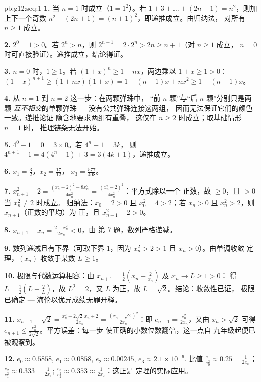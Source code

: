 \begin{solution}{pb:g12:seq:1}
\textbf{1.} 当 $n = 1$ 时成立（$1 = 1^2$）。若
$1 + 3 + \dots + (2n - 1) = n^2$，则加上下一个奇数
$n^2 + (2n + 1) = (n + 1)^2$，即递推成立。由归纳法，
对所有 $n \geq 1$ 成立。

\textbf{2.} $2^0 = 1 > 0$。若 $2^n > n$，则
$2^{n+1} = 2 \cdot 2^n > 2n \geq n + 1$（对 $n \geq 1$ 成立，
$n = 0$ 时可直接验证）。递推成立，结论得证。

\textbf{3.} $n = 0$ 时，$1 \geq 1$。若
$(1 + x)^n \geq 1 + nx$，两边乘以 $1 + x \geq 1 > 0$：
$(1 + x)^{n+1} \geq (1 + nx)(1 + x) = 1 + (n + 1)x + nx^2
\geq 1 + (n + 1)x$。

\textbf{4.} 从 $n = 1$ 到 $n = 2$ 这一步：在两颗弹珠中，
“前 $n$ 颗”与“后 $n$ 颗”分别只是两颗
\emph{互不相交}的单颗弹珠 --- 没有公共弹珠连接这两组，
因而无法保证它们的颜色一致。递推论证
隐含地要求两组有重叠，
这仅在 $n \geq 2$ 时成立；取基础情形 $n = 1$ 时，
推理链条无法开始。

\textbf{5.} $4^0 - 1 = 0 = 3 \times 0$。若 $4^n - 1 = 3k$，
则 $4^{n+1} - 1 = 4(4^n - 1) + 3 = 3(4k + 1)$，递推成立。

\textbf{6.} $x_1 = \frac32$，$x_2 = \frac{17}{12}$，
$x_3 = \frac{577}{408}$。

\textbf{7.} $x_{n+1}^2 - 2 = \frac{(x_n^2 + 2)^2 - 8x_n^2}
{4x_n^2} = \frac{(x_n^2 - 2)^2}{4 x_n^2}$：平方式除以一个
正数，故 $\geq 0$，且 $> 0$ 当 $x_n^2 \neq 2$ 时成立。
归纳法：$x_0 = 2 > 0$ 且 $x_0^2 = 4 > 2$；若 $x_n > 0$
且 $x_n^2 > 2$，则 $x_{n+1}$（正数的平均）为
正，且 $x_{n+1}^2 - 2 > 0$。

\textbf{8.} $x_{n+1} - x_n = \frac{2 - x_n^2}{2x_n} < 0$，由
第 7 题，数列严格递减。

\textbf{9.} 数列递减且有下界（可取下界 $1$，因为
$x_n^2 > 2 > 1$ 且 $x_n > 0$）。由单调收敛
定理，$(x_n)$ 收敛于某数 $L \geq 1$。

\textbf{10.} 极限与代数运算相容：由
$x_{n+1} = \frac12\left(x_n + \frac{2}{x_n}\right)$ 及
$x_n \to L \geq 1 > 0$：
得 $L = \frac12\left(L + \frac2L\right)$，故 $L^2 = 2$，又 $L$
为正，故 $L = \sqrt2$。结论：收敛性已证，
极限已确定 --- 海伦以优异成绩无罪开释。

\textbf{11.} $x_{n+1} - \sqrt2 = \frac{x_n^2 - 2\sqrt2\,x_n +
2}{2x_n} = \frac{(x_n - \sqrt2)^2}{2x_n}$：即
$e_{n+1} = \frac{e_n^2}{2x_n}$，又由 $x_n > \sqrt2$ 可得
$e_{n+1} \leq \frac{e_n^2}{2\sqrt2}$。平方误差：每一步
使正确的小数位数翻倍，这一点自
九年级起便已被观察到。

\textbf{12.} $e_0 \approx 0.5858$, $e_1 \approx 0.0858$,
$e_2 \approx 0.00245$, $e_3 \approx 2.1 \times 10^{-6}$.
比值 $\frac{e_1}{e_0^2} \approx 0.25 = \frac{1}{2x_0}$；
$\frac{e_2}{e_1^2} \approx 0.333 = \frac{1}{2x_1}$;
$\frac{e_3}{e_2^2} \approx 0.353 \approx \frac{1}{2x_2}$：这正是
定理的实际应用。


\end{solution}

